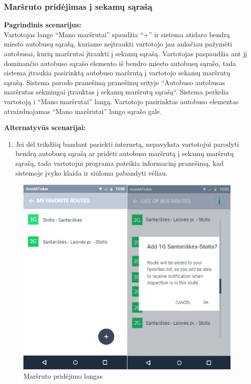 \documentclass{VUMIFPSkursinis}
\begin{document}
\subsubsection{Maršruto pridėjimas į sekamų sąrašą}
	\textbf{Pagrindinis scenarijus:}\\
	Vartotojas lange “Mano maršrutai” spaudžia “+” ir sistema atidaro bendrą miesto autobusų sąrašą, kuriame neįtraukti 
	vartotojo jau anksčiau pažymėti autobusai, kurių maršrutai įtraukti į sekamų sąrašą. Vartotojas paspaudžia ant jį 
	dominančio autobuso sąrašo elemento iš bendro miesto autobusų sąrašo, tada sistema įtraukia pasirinktą autobuso maršrutą 
	į vartotojo sekamų maršrutų sąrašą. Sistema parodo pranešimą pranešimų srityje “Autobuso {autobusas} maršrutas sėkmingai 
	įtrauktas į sekamų maršrutų sąrašą“. Sistema perkelia vartotoją i “Mano maršrutai” langą. Vartotojo pasirinktas autobuso 
	elementas atvaizduojamas “Mano maršrutai” lango sąrašo gale.

	\textbf{Alternatyvūs scenarijai:}
	\begin{enumerate}[itemsep=-2mm]
		\item Jei dėl trikdžių bandant pasiekti internetą, nepavyksta vartotojui parodyti bendrą autobusų sąrašą ar pridėti autobuso maršrutą į sekamų maršrutų sąrašą, tada vartotojui programa pateikia informacinį pranešimą, kad sistemoje įvyko klaida ir siūloma pabandyti vėliau.
	\end{enumerate} 
	\begin{figure}[H]
				\centering
				\includegraphics[scale=1.5]{img/mockup_AddRoute}
				\caption{Maršruto pridėjimo langas}
				\label{img:Maršruto pridėjimo langas}
			\end{figure}
\end{document}
